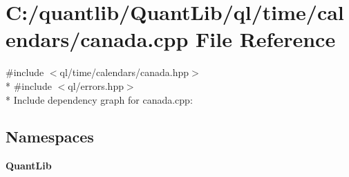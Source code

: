 \section{C\+:/quantlib/\+Quant\+Lib/ql/time/calendars/canada.cpp File Reference}
\label{canada_8cpp}
{\ttfamily \#include $<$ql/time/calendars/canada.\+hpp$>$}\\*
{\ttfamily \#include $<$ql/errors.\+hpp$>$}\\*
Include dependency graph for canada.\+cpp\+:
\subsection*{Namespaces}
\begin{DoxyCompactItemize}
\item 
 {\bf Quant\+Lib}
\end{DoxyCompactItemize}
